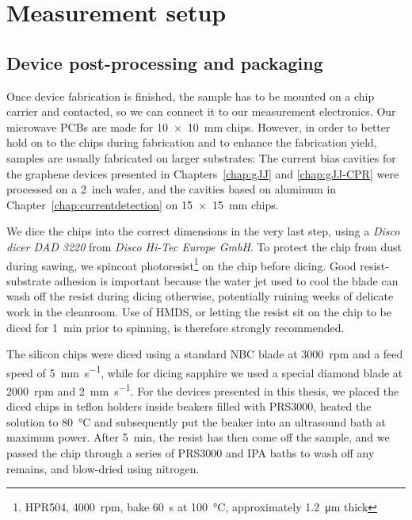 \section{Measurement setup}

\subsection{Device post-processing and packaging}\label{sec:fab-packaging}

Once device fabrication is finished, the sample has to be mounted on a chip carrier and contacted, so we can connect it to our measurement electronics.
% 
Our microwave PCBs are made for \SI{10x10}{\milli\meter} chips.
%
However, in order to better hold on to the chips during fabrication and to enhance the fabrication yield, samples are usually fabricated on larger substrates:
% 
The current bias cavities for the graphene devices presented in Chapters~\ref{chap:gJJ} and \ref{chap:gJJ-CPR} were processed on a \SI{2}{inch} wafer, and the cavities based on aluminum in Chapter~\ref{chap:currentdetection} on \SI{15x15}{\milli\meter} chips.

We dice the chips into the correct dimensions in the very last step, using a \textit{Disco dicer DAD 3220} from \textit{Disco Hi-Tec Europe GmbH}.
% 
To protect the chip from dust during sawing, we spincoat photoresist\footnote{HPR504, \SI{4000}{rpm}, bake \SI{60}{\second} at \SI{100}{\celsius}, approximately \SI{1.2}{\micro\meter} thick} on the chip before dicing.
% 
Good resist-substrate adhesion is important because the water jet used to cool the blade can wash off the resist during dicing otherwise, potentially ruining weeks of delicate work in the cleanroom.
% 
Use of HMDS, or letting the resist sit on the chip to be diced for \SI{1}{\minute} prior to spinning, is therefore strongly recommended.

The silicon chips were diced using a standard NBC blade at \SI{3000}{rpm} and a feed speed of \SI{5}{\milli\meter\per\second}, while for dicing sapphire we used a special diamond blade at \SI{2000}{rpm} and \SI{2}{\milli\meter\per\second}.
% 
For the devices presented in this thesis, we placed the diced chips in teflon holders inside beakers filled with PRS3000, heated the solution to \SI{80}{\celsius} and subsequently put the beaker into an ultrasound bath at maximum power.
% 
After \SI{5}{\minute}, the resist has then come off the sample, and we passed the chip through a series of PRS3000 and IPA baths to wash off any remains, and blow-dried using nitrogen.


